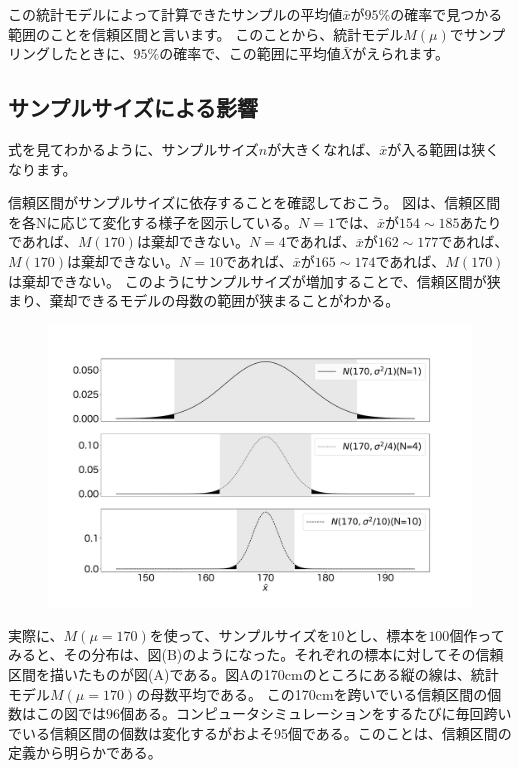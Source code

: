 この統計モデルによって計算できたサンプルの平均値$\bar{x}$が$95\%$の確率で見つかる範囲のことを信頼区間と言います。
このことから、統計モデル$M(\mu)$でサンプリングしたときに、$95\%$の確率で、この範囲に平均値$\bar{X}$がえられます。

\subsection{サンプルサイズによる影響}
式を見てわかるように、サンプルサイズ$n$が大きくなれば、$\bar{x}$が入る範囲は狭くなります。

信頼区間がサンプルサイズに依存することを確認しておこう。
図は、信頼区間を各Nに応じて変化する様子を図示している。$N=1$では、$\bar{x}$が$154\sim185$あたりであれば、$M(170)$は棄却できない。$N=4$であれば、$\bar{x}$が$162\sim177$であれば、$M(170)$は棄却できない。$N=10$であれば、$\bar{x}$が$165\sim174$であれば、$M(170)$は棄却できない。
このようにサンプルサイズが増加することで、信頼区間が狭まり、棄却できるモデルの母数の範囲が狭まることがわかる。
\begin{figure}

\begin{center}
    \includegraphics[width=15cm]{./image/03_/confidence_interval.pdf}
  \end{center}
\end{figure}


実際に、$M(\mu=170)$を使って、$サンプルサイズを10$とし、標本を$100$個作ってみると、その分布は、図(B)のようになった。それぞれの標本に対してその信頼区間を描いたものが図(A)である。図Aの170cmのところにある縦の線は、統計モデル$M(\mu=170)$の母数平均である。
この170cmを跨いでいる信頼区間の個数はこの図では$96$個ある。コンピュータシミュレーションをするたびに毎回跨いでいる信頼区間の個数は変化するがおよそ95個である。このことは、信頼区間の定義から明らかである。


